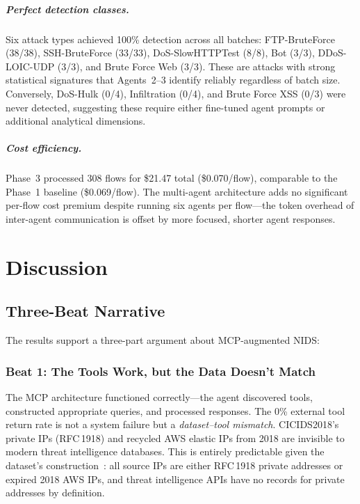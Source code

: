 \documentclass[12pt, a4paper, oneside]{report}
\begin{document}
\paragraph{Perfect detection classes.}
Six attack types achieved 100\% detection across all batches: FTP-BruteForce
(38/38), SSH-BruteForce (33/33), DoS-SlowHTTPTest (8/8), Bot (3/3), DDoS-LOIC-UDP
(3/3), and Brute Force Web (3/3). These are attacks with strong statistical
signatures that Agents~2--3 identify reliably regardless of batch size. Conversely,
DoS-Hulk (0/4), Infiltration (0/4), and Brute Force XSS (0/3) were never detected,
suggesting these require either fine-tuned agent prompts or additional analytical
dimensions.

\paragraph{Cost efficiency.}
Phase~3 processed 308 flows for \$21.47 total (\$0.070/flow), comparable to the
Phase~1 baseline (\$0.069/flow). The multi-agent architecture adds no significant
per-flow cost premium despite running six agents per flow---the token overhead of
inter-agent communication is offset by more focused, shorter agent responses.


\chapter{Discussion}
\label{ch:discussion}

\section{Three-Beat Narrative}
\label{sec:three-beat}

The results support a three-part argument about MCP-augmented NIDS:

\subsection{Beat 1: The Tools Work, but the Data Doesn't Match}

The MCP architecture functioned correctly---the agent discovered tools,
constructed appropriate queries, and processed responses. The 0\% external
tool return rate is not a system failure but a \emph{dataset--tool mismatch}.
CICIDS2018's private IPs (RFC\,1918) and recycled AWS elastic IPs from 2018
are invisible to modern threat intelligence databases. This is entirely
predictable given the dataset's construction~\cite{engelen2021cicids,
kenyon2020datasets}: all source IPs are either RFC\,1918 private addresses or
expired 2018 AWS IPs, and threat intelligence APIs have no records for private
addresses by definition.
\end{document}
